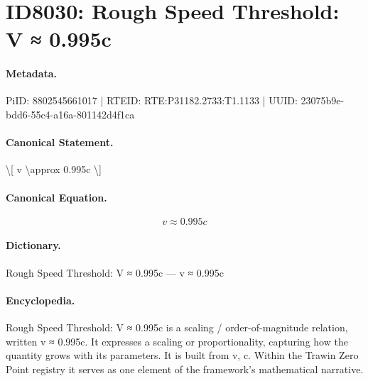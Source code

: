 \section*{ID8030: Rough Speed Threshold: V ≈ 0.995c}
\paragraph{Metadata.}
PiID: 8802545661017 | RTEID: RTE:P31182.2733:T1.1133 | UUID: 23075b9e-bdd6-55c4-a16a-801142d4f1ca

\paragraph{Canonical Statement.}
\textbackslash{}[ v \textbackslash{}approx 0.995c \textbackslash{}]

\paragraph{Canonical Equation.}
\[
v \approx 0.995c
\]

\paragraph{Dictionary.}
Rough Speed Threshold: V ≈ 0.995c — v ≈ 0.995c

\paragraph{Encyclopedia.}
Rough Speed Threshold: V ≈ 0.995c is a scaling / order-of-magnitude relation, written v ≈ 0.995c. It expresses a scaling or proportionality, capturing how the quantity grows with its parameters. It is built from v, c. Within the Trawin Zero Point registry it serves as one element of the framework's mathematical narrative.
